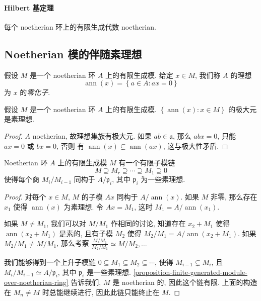 \paragraph{Hilbert 基定理}

\begin{theorem}[Hilbert基]
  \label{theorem-Hilbert-basis}
  每个 noetherian 环上的有限生成代数 noetherian.
\end{theorem}

\subsection{Noetherian 模的伴随素理想}

假设 \( M \) 是一个 noetherian 环 \( A \) 上的有限生成模. 给定 \( x \in M \),
我们称 \( A \) 的理想
\[
  \operatorname{ann}(x) = \left\lbrace a \in A: ax = 0 \right\rbrace
\]
为 \( x \) 的\emph{零化子}.

\begin{lemma}
  假设 \( M \) 是一个 noetherian 环 \( A \) 上的有限生成模. \( \left\lbrace
  \operatorname{ann}(x) : x \in M \right\rbrace \) 的极大元是素理想.
\end{lemma}
\begin{proof}
  \( A \) noetherian, 故理想集族有极大元. 如果 \( ab \in
  \mathfrak{a} \), 那么 \( abx = 0 \), 只能 \( ax = 0 \) 或 \( bx = 0 \), 否则
  有 \( \operatorname{ann}(x) \subsetneq \operatorname{ann}(ax) \),
  这与极大性矛盾.
\end{proof}

\begin{proposition}
  Noetherian 环 \( A \) 上的有限生成模 \( M \) 有一个有限子模链
  \[
    M \supseteq M_r \supseteq \cdots \supseteq M_1 \supseteq 0
  \]
  使得每个商 \( M_i / M_{i - 1} \) 同构于 \( A / \mathfrak{p}_i \), 其中 \(
  \mathfrak{p}_i \) 为一些素理想.
\end{proposition}
\begin{proof}
  对每个 \( x \in M \), \( M \) 的子模 \( Ax \) 同构于 \( A /
  \operatorname{ann}(x) \). 如果 \( M \) 非零, 那么存在 \( x_1 \) 使得 \(
  \operatorname{ann}(x) \) 为素理想. 令 \( Ax = M_1 \), 这时 \( M_1 = A /
  \operatorname{ann}(x_1) \).

  如果 \( M \neq M_1 \), 我们可以对 \( M / M_1 \) 作相同的讨论, 知道存在 \( x_2
  + M_1 \) 使得 \( \operatorname{ann}(x_2 + M_1) \) 是素的, 且有子模 \( M_2 \)
  使得 \( M_2 / M_1 = A / \operatorname{ann}(x_2 + M_1) \). 如果 \( M_2 / M_1
  \neq M / M_1 \), 那么考察 \( \frac{M / M_1}{M_2 / M_1} \simeq M / M_2, \ldots \)

  我们能够得到一个上升子模链 \( 0 \subseteq M_1 \subseteq M_2 \subseteq \cdots
  \), 使得 \( M_{i -  1} \subsetneq M_{i} \), 且 \( M_{i} / M_{i - 1} \simeq A /
  \mathfrak{p}_{i} \), 其中 \( \mathfrak{p}_i \) 是一些素理想.
  \cref{proposition-finite-generated-module-over-noetherian-ring} 告诉我们, \( M
  \) 是 noetherian 的, 因此这个链有限. 上面的构造在 \( M_n \neq M \)
  时总能继续进行, 因此此链只能终止在 \( M \).
\end{proof}

